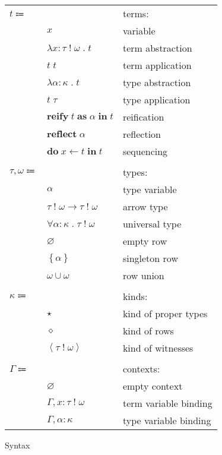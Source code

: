 \documentclass[12pt]{article}
\newcommand\kAnno[2]{#1 : #2}
\newcommand\tAnno[3]{#1 : \tEmbellished{#2}{#3}}
\newcommand\term{t}
\newcommand\eVar{x}
\newcommand\eAbs[4]{\lambda \tAnno{#1}{#2}{#3} \; . \; #4}
\newcommand\eApp[2]{#1 \; #2}
\newcommand\eTAbs[3]{\lambda \kAnno{#1}{#2} \; . \; #3}
\newcommand\eTApp[2]{#1 \; #2}
\newcommand\eReify[3]{\textbf{reify} \; #1 \; \textbf{as} \; #2 \; \textbf{in} \; #3}
\newcommand\eReflect[1]{\textbf{reflect} \; #1}
\newcommand\eDo[3]{\textbf{do} \; #1 \leftarrow #2 \; \textbf{in} \; #3}
\newcommand\type{\tau}
\newcommand\tVar{\alpha}
\newcommand\tArrow[4]{\tEmbellished{#1}{#2} \rightarrow \tEmbellished{#3}{#4}}
\newcommand\tForAll[4]{\forall \kAnno{#1}{#2} \; . \; \tEmbellished{#3}{#4}}
\newcommand\row{\omega}
\newcommand\tEmbellished[2]{#1 \; ! \; #2}
\newcommand\tEmpty{\varnothing}
\newcommand\tSingleton[1]{\left\{ #1 \right\}}
\newcommand\tUnion[2]{#1 \cup #2}
\newcommand\kind{\kappa}
\newcommand\kType{\star}
\newcommand\kRow{\diamond}
\newcommand\kWitness[2]{\left\langle \tEmbellished{#1}{#2} \right\rangle}
\newcommand\context{\Gamma}
\newcommand\cEmpty{\varnothing}
\newcommand\cEExtend[4]{#1, \tAnno{#2}{#3}{#4}}
\newcommand\cTExtend[3]{#1, \kAnno{#2}{#3}}
\begin{document}
      \begin{figure}[H]
        \begin{mdframed}[backgroundcolor=none]
          \begin{center}
            \begin{tabular}{l l l}
              $\term \Coloneqq$ & & terms: \\
              & $\eVar$ & variable \\
              & $\eAbs{\eVar}{\type}{\row}{\term}$ & term abstraction \\
              & $\eApp{\term}{\term}$ & term application \\
              & $\eTAbs{\tVar}{\kind}{\term}$ & type abstraction \\
              & $\eTApp{\term}{\type}$ & type application \\
              & $\eReify{\term}{\tVar}{\term}$ & reification \\
              & $\eReflect{\tVar}$ & reflection \\
              & $\eDo{\eVar}{\term}{\term}$ & sequencing \\
              \\
              $\type, \row \Coloneqq$ & & types: \\
              & $\tVar$ & type variable \\
              & $\tArrow{\type}{\row}{\type}{\row}$ & arrow type \\
              & $\tForAll{\tVar}{\kind}{\type}{\row}$ & universal type \\
              & $\tEmpty$ & empty row \\
              & $\tSingleton{\tVar}$ & singleton row \\
              & $\tUnion{\row}{\row}$ & row union \\
              \\
              $\kind \Coloneqq$ & & kinds: \\
              & $\kType$ & kind of proper types \\
              & $\kRow$ & kind of rows \\
              & $\kWitness{\type}{\row}$ & kind of witnesses \\
              \\
              $\context \Coloneqq$ & & contexts: \\
              & $\cEmpty$ & empty context \\
              & $\cEExtend{\context}{\eVar}{\type}{\row}$ & term variable binding \\
              & $\cTExtend{\context}{\tVar}{\kind}$ & type variable binding \\
            \end{tabular}
          \end{center}

          \caption{Syntax}\label{fig:syntax}
        \end{mdframed}
      \end{figure}
\end{document}

